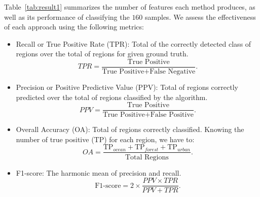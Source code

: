 \documentclass[journal]{IEEEtran}
\begin{document}
	Table~\ref{tab:result1} summarizes the number of features each method produces, as well as its performance of classifying the $160$ samples.
	We assess the effectiveness of each approach using the following metrics: 
	\begin{itemize}
		\item Recall or True Positive Rate (TPR): Total of the correctly detected class of regions over the total of regions for given ground truth.
		\begin{equation*}
		TPR = \frac{\text{True Positive}}{\text{True Positive} + \text{False Negative}}.
		\end{equation*}
		\item Precision or Positive Predictive Value (PPV): Total of regions correctly predicted over the total of regions classified by the algorithm.
		\begin{equation*}
		PPV = \frac{\text{True Positive}}{\text{True Positive} + \text{False Positive}}.
		\end{equation*}
		\item Overall Accuracy (OA): Total of regions correctly classified. 
		Knowing the number of true positive (TP) for each region, we have to:
		\begin{equation*}
		OA = \frac{\text{TP}_{ocean} + \text{TP}_{forest} + \text{TP}_{urban}}{\text{Total Regions}}.
		\end{equation*}
		\item F1-score: The harmonic mean of precision and recall.
		\begin{equation*}
		\text{F1-score} = 2 \times \frac{PPV \times TPR}{PPV + TPR}.
		\end{equation*}
	\end{itemize}
	
\end{document}

